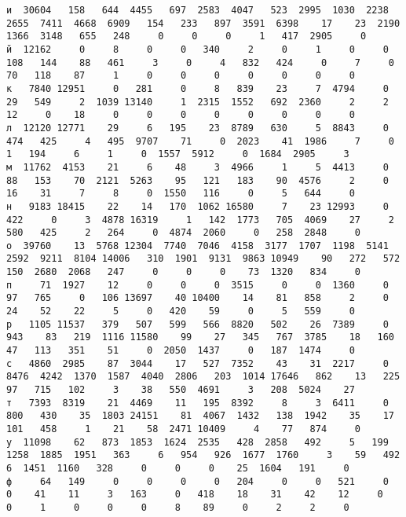 \documentclass{article}
\begin{document}
\begin{landscape}
\begin{addmargin}{0em}
\begin{verbatim}
и  30604   158   644  4455   697  2583  4047   523  2995  1030  2238  2655  7411  4668  6909   154   233   897  3591  6398    17    23  2190  1366  3148   655   248     0     0     0     1   417  2905     0
й  12162     0     8     0     0   340     2     0     1     0     0   108   144    88   461     3     0     4   832   424     0     7     0    70   118    87     1     0     0     0     0     0     0     0
к   7840 12951     0   281     0     8   839    23     7  4794     0    29   549     2  1039 13140     1  2315  1552   692  2360     2     2    12     0    18     0     0     0     0     0     0     0     0
л  12120 12771    29     6   195    23  8789   630     5  8843     0   474   425     4   495  9707    71     0  2023    41  1986     7     0     1   194     6     1     0  1557  5912     0  1684  2905     3
м  11762  4153    21     6    48     3  4966     1     5  4413     0    88   153    70  2121  5263    95   121   183    90  4576     2     0    16    31     7     8     0  1550   116     0     5   644     0
н   9183 18415    22    14   170  1062 16580     7    23 12993     0   422     0     3  4878 16319     1   142  1773   705  4069    27     2   580   425     2   264     0  4874  2060     0   258  2848     0
о  39760    13  5768 12304  7740  7046  4158  3177  1707  1198  5141  2592  9211  8104 14006   310  1901  9131  9863 10949    90   272   572   150  2680  2068   247     0     0     0    73  1320   834     0
п     71  1927    12     0     0     0  3515     0     0  1360     0    97   765     0   106 13697    40 10400    14    81   858     2     0    24    52    22     5     0   420    59     0     5   559     0
р   1105 11537   379   507   599   566  8820   502    26  7389     0   943    83   219  1116 11580    99    27   345   767  3785    18   160    47   113   351    51     0  2050  1437     0   187  1474     0
с   4860  2985    87  3044    17   527  7352    43    31  2217     0  8476  4242  1370  1587  4040  2806   203  1014 17646   862    13   225    97   715   102     3    38   550  4691     3   208  5024    27
т   7393  8319    21  4469    11   195  8392     8     3  6411     0   800   430    35  1803 24151    81  4067  1432   138  1942    35    17   101   458     1    21    58  2471 10409     4    77   874     0
у  11098    62   873  1853  1624  2535   428  2858   492     5   199  1258  1885  1951   363     6   954   926  1677  1760     3    59   492     6  1451  1160   328     0     0     0    25  1604   191     0
ф     64   149     0     0     0     0   204     0     0   521     0     0    41    11     3   163     0   418    18    31    42    12     0     0     1     0     0     0     8    89     0     2     2     0

\end{verbatim}
\end{addmargin}
\end{landscape}
\end{document}

